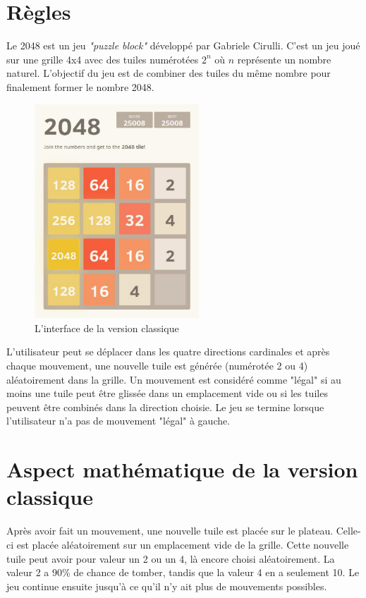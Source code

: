\documentclass[a4paper, 12pt]{report}
\begin{document}
\section{Règles}

\tabto{1cm}Le 2048 est un jeu \textit{"puzzle block"} développé par Gabriele Cirulli. C'est un jeu joué sur
une grille 4x4 avec des tuiles numérotées ${2^{n}}$ où ${n}$ représente un nombre naturel. L'objectif
du jeu est de combiner des tuiles du même nombre pour finalement former le nombre 2048.

\begin{figure}[!t]
\centering
\includegraphics[width=0.55\textwidth]{images/2048-classic-version.jpg}
\caption{L'interface de la version classique}
\label{Classic version}
\end{figure}

\vspace{0.5cm}

\tabto{1cm}L'utilisateur peut se déplacer dans les quatre directions cardinales et après chaque mouvement,
une nouvelle tuile est générée (numérotée 2 ou 4) aléatoirement dans la grille. Un mouvement est
considéré comme "légal" si au moins une tuile peut être glissée dans un emplacement vide ou si les tuiles
peuvent être combinés dans la direction choisie. Le jeu se termine lorsque l'utilisateur n'a pas de mouvement
"légal" à gauche.

\section{Aspect mathématique de la version classique}

\tabto{1cm}Après avoir fait un mouvement, une nouvelle tuile est placée sur le plateau.
Celle-ci est placée aléatoirement sur un emplacement vide de la grille. Cette nouvelle tuile
peut avoir pour valeur un 2 ou un 4, là encore choisi aléatoirement. La valeur 2 a 90\% de chance
de tomber, tandis que la valeur 4 en a seulement 10. Le jeu continue ensuite jusqu'à ce qu'il n'y
ait plus de mouvements possibles.
\end{document}
